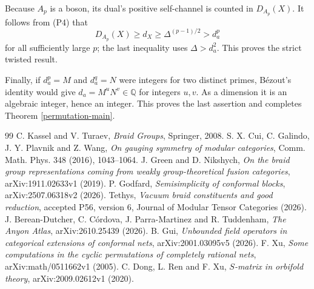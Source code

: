 \documentclass[10pt]{amsart}
\begin{document}
Because $A_p$ is a boson, its dual's positive self-channel
is counted in $D_{A_p}(X)$. It follows from (P4) that
\[
 D_{A_p}(X)\ge d_X\ge\Delta^{(p-1)/2}>d_a^p
\]
for all sufficiently large $p$; the last inequality uses
$\Delta>d_a^2$. This proves the strict twisted result.

Finally, if $d_a^p=M$ and $d_a^q=N$ were integers for
two distinct primes, B\'ezout's identity would give
$d_a=M^uN^v\in\mathbb Q$ for integers $u,v$.
As a dimension it is an algebraic integer, hence an
integer. This proves the last assertion and completes
Theorem \ref{permutation-main}.


\begin{thebibliography}{99}
 C. Kassel and V. Turaev, \emph{Braid Groups}, Springer, 2008.
 S. X. Cui, C. Galindo, J. Y. Plavnik and Z. Wang,
\emph{On gauging symmetry of modular categories}, Comm. Math. Phys.
348 (2016), 1043--1064.
 J. Green and D. Nikshych,
\emph{On the braid group representations coming from weakly
group-theoretical fusion categories}, arXiv:1911.02633v1 (2019).
 P. Godfard, \emph{Semisimplicity of conformal blocks},
arXiv:2507.06318v2 (2026).
 Tethys, \emph{Vacuum braid constituents and good reduction},
accepted P56, version 6, Journal of Modular Tensor Categories (2026).
 J. Berean-Dutcher, C. C\'ordova, J. Parra-Martinez
and R. Tuddenham, \emph{The Anyon Atlas}, arXiv:2610.25439 (2026).
 B. Gui, \emph{Unbounded field operators in categorical
extensions of conformal nets}, arXiv:2001.03095v5 (2026).
 F. Xu, \emph{Some computations in the cyclic permutations
of completely rational nets}, arXiv:math/0511662v1 (2005).
 C. Dong, L. Ren and F. Xu,
\emph{$S$-matrix in orbifold theory}, arXiv:2009.02612v1 (2020).
\end{thebibliography}
\end{document}
